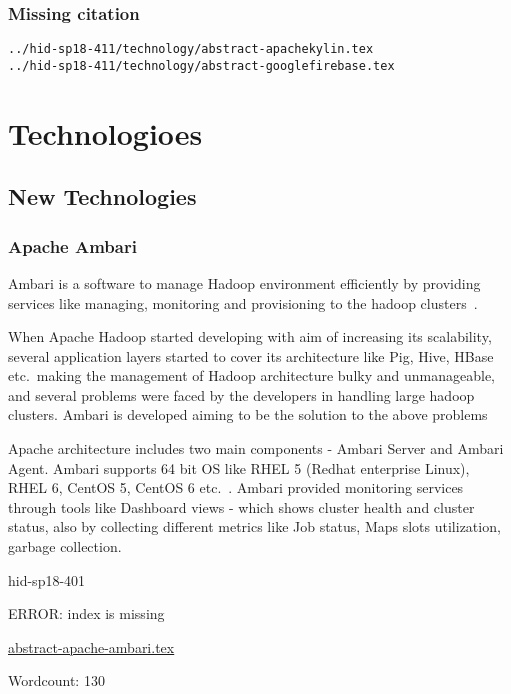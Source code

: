 \section{Missing citation}
\begin{verbatim}
../hid-sp18-411/technology/abstract-apachekylin.tex
../hid-sp18-411/technology/abstract-googlefirebase.tex

\end{verbatim}
\part{Technologioes}
\chapter{New Technologies}
\section{Apache Ambari}  

Ambari is a software  to manage Hadoop environment
efficiently by providing services like managing, monitoring and provisioning to
the hadoop clusters~\cite{hid-sp18-401-wiki-Ambari}.

When Apache Hadoop started developing with aim of increasing its scalability,
several application layers started to cover its architecture like Pig, Hive,
HBase etc.\ making the management of Hadoop architecture bulky and unmanageable,
and several problems were faced by the developers in handling large hadoop
clusters. Ambari is developed aiming to be the solution to the above problems


Apache architecture includes two main components - Ambari Server and Ambari
Agent. Ambari supports 64 bit OS like RHEL 5 (Redhat enterprise Linux), RHEL 6,
CentOS 5, CentOS 6 etc.~\cite{hid-sp18-401-Ambari}. Ambari provided monitoring
services through tools like Dashboard views - which shows cluster health and
cluster status, also by collecting different metrics like Job status, Maps slots
utilization, garbage collection.



\begin{IU}

hid-sp18-401

ERROR: index is missing

\href{https://github.com/cloudmesh-community/hid-sp18-401/blob/master//technology/abstract-apache-ambari.tex}{abstract-apache-ambari.tex}

 

Wordcount: 130

\end{IU}

